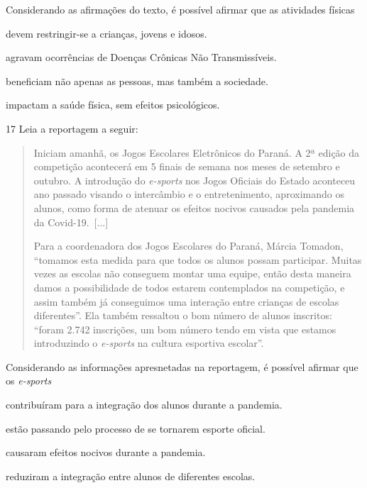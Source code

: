 Considerando as afirmações do texto, é possível afirmar que as atividades
físicas

\begin{escolha}
\item devem restringir-se a crianças, jovens e idosos.

\item agravam ocorrências de Doenças Crônicas Não Transmissíveis.

\item beneficiam não apenas as pessoas, mas também a sociedade.

\item impactam a saúde física, sem efeitos psicológicos.
\end{escolha}

\num{17}  Leia a reportagem a seguir:

\begin{quote}
Iniciam amanhã, os Jogos Escolares Eletrônicos do Paraná. A 2ª edição da
competição acontecerá em 5 finais de semana nos meses de setembro e
outubro. A introdução do \textit{e-sports} nos Jogos Oficiais do Estado aconteceu
ano passado visando o intercâmbio e o entretenimento, aproximando os
alunos, como forma de atenuar os efeitos nocivos causados pela pandemia
da Covid-19.~{[}...{]}

Para a coordenadora dos Jogos Escolares do Paraná, Márcia Tomadon,
``tomamos esta medida para que todos os alunos possam participar. Muitas
vezes as escolas não conseguem montar uma equipe, então desta maneira
damos a possibilidade de todos estarem contemplados na competição, e
assim também já conseguimos uma interação entre crianças de escolas
diferentes''. Ela também ressaltou o bom número de alunos inscritos:
``foram 2.742 inscrições, um bom número tendo em vista que estamos
introduzindo o \textit{e-sports} na cultura esportiva escolar''.

\end{quote}

Considerando as informações apresnetadas na reportagem, é possível afirmar
que os \textit{e-sports}

\begin{escolha}
\item contribuíram para a integração dos alunos durante a pandemia.

\item estão passando pelo processo de se tornarem esporte oficial.  

\item causaram efeitos nocivos durante a pandemia.

\item reduziram a integração entre alunos de diferentes escolas.
\end{escolha}

